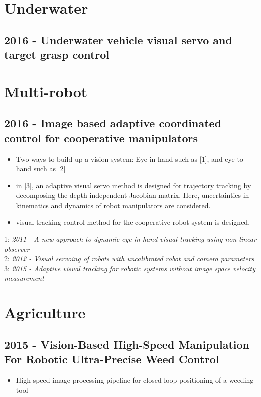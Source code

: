 \section{Underwater}
\subsection{2016 - Underwater vehicle visual servo and target grasp control}


\section{Multi-robot}
\subsection{2016 - Image based adaptive coordinated control for cooperative manipulators}
\begin{itemize}
\item Two ways to build up a vision system: Eye in hand such as [1], and eye to hand such as [2]
\item in [3], an adaptive visual servo method is designed for trajectory tracking by decomposing the depth-independent Jacobian matrix. Here, uncertainties in kinematics and dynamics of robot manipulators are considered. 
\item visual tracking control method for the cooperative robot system is designed. 
\end{itemize}
1: \textit{2011 - A new approach to dynamic eye-in-hand visual tracking using non-linear observer} \\
2: \textit{2012 - Visual servoing of robots with uncalibrated robot and camera parameters} \\
3: \textit{2015 - Adaptive visual tracking for robotic systems without image space velocity measurement}

\section{Agriculture}
\subsection{2015 - Vision-Based High-Speed Manipulation For Robotic Ultra-Precise Weed Control}
\begin{itemize}
\item High speed image processing pipeline for closed-loop positioning of a weeding tool
\end{itemize}